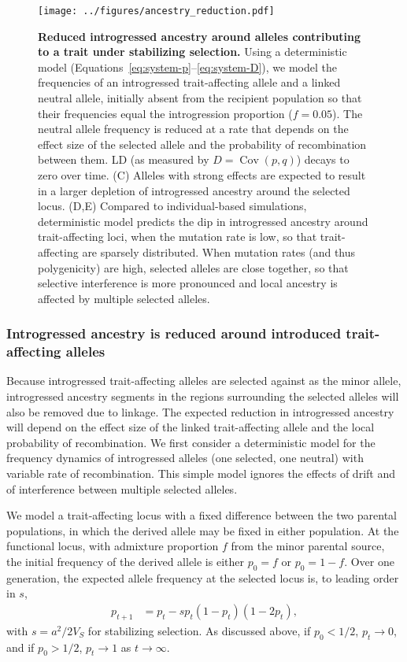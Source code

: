 \documentclass{article}
\DeclareMathOperator{\Cov}{Cov}
\begin{document}
\begin{figure}[ht!]
    \centering
    \texttt{[image: ../figures/ancestry\_reduction.pdf]}
    \caption{
        \textbf{Reduced introgressed ancestry around alleles contributing to a
        trait under stabilizing selection.}
        Using a deterministic model
        (Equations~\ref{eq:system-p}--\ref{eq:system-D}), we model the
        frequencies of an introgressed trait-affecting allele and a linked
        neutral allele, initially absent from the recipient population so that
        their frequencies equal the introgression proportion ($f=0.05$).
        The neutral allele frequency is reduced at a rate that depends on
        the effect size of the selected allele and the probability of
        recombination between them. LD (as measured by $D=\Cov(p,q)$) decays
        to zero over time.
        (C) Alleles with strong effects are expected to result in a larger
        depletion of introgressed ancestry around the selected locus.
        (D,E) Compared to individual-based simulations, deterministic model
        predicts the dip in introgressed ancestry around trait-affecting loci,
        when the mutation rate is low, so that trait-affecting are sparsely
        distributed. When mutation rates (and thus polygenicity) are high,
        selected alleles are close together, so that selective interference
        is more pronounced and local ancestry is affected by multiple selected
        alleles.
    }
    \label{fig:linkage}
\end{figure}

\subsubsection*{Introgressed ancestry is reduced around introduced
trait-affecting alleles}

Because introgressed trait-affecting alleles are selected against as the minor
allele, introgressed ancestry segments in the regions surrounding the selected
alleles will also be removed due to linkage. The expected reduction in
introgressed ancestry will depend on the effect size of the linked
trait-affecting allele and the local probability of recombination. We first
consider a deterministic model for the frequency dynamics of introgressed
alleles (one selected, one neutral) with variable rate of recombination. This
simple model ignores the effects of drift and of interference between multiple
selected alleles.

We model a trait-affecting locus with a fixed difference between the two
parental populations, in which the derived allele may be fixed in either
population. At the functional locus, with admixture proportion $f$ from the
minor parental source, the initial frequency of the derived allele is either
$p_0=f$ or $p_0=1-f$. Over one generation, the expected allele frequency at the
selected locus is, to leading order in $s$,
\begin{align}\label{eq:system-p}
    p_{t+1} & = p_t - s p_t(1-p_t)(1-2p_t),
\end{align}
with \(s=a^2/2V_S\) for stabilizing selection.
As discussed above, if \(p_0<1/2\), \(p_t\rightarrow0\), and if
\(p_0>1/2\), \(p_t\rightarrow1\) as \(t\rightarrow\infty\).
\end{document}
